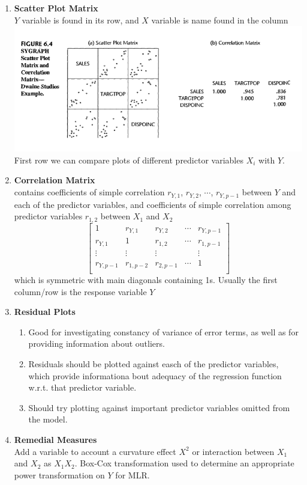 \documentclass[11pt]{article}
\begin{document}
\begin{enumerate}
    \item \textbf{Scatter Plot Matrix} \\
    $Y$ variable is found in its row, and $X$ variable is name found in the column \\ 
    \includegraphics[width=\textwidth]{scatter_plot_matrix.png} \\
    First row we can compare plots of different predictor variables $X_i$ with $Y$. 
    \item \textbf{Correlation Matrix} \\
    contains coefficients of simple correlation $r_{Y,1}$, $r_{Y,2}$, $\cdots$, $r_{Y,p-1}$ between $Y$ and each of the predictor variables, and coefficients of simple correlation among predictor variables $r_{1,2}$ between $X_1$ and $X_2$
    \[
        \begin{bmatrix}
            1 & r_{Y,1} & r_{Y,2} & \cdots & r_{Y,p-1} \\ 
            r_{Y,1} & 1 & r_{1,2} & \cdots & r_{1,p-1} \\ 
            \vdots & \vdots & \vdots & & \vdots \\
            r_{Y,p-1} & r_{1,p-2} & r_{2,p-1} & \cdots & 1 \\ 
        \end{bmatrix}    
    \]
    which is symmetric with main diagonals containing 1s. Usually the first column/row is the response variable $Y$
    \item \textbf{Residual Plots} \\
    \begin{enumerate}
        \item Good for investigating constancy of variance of error terms, as well as for providing information about outliers.
        \item Residuals should be plotted against easch of the predictor variables, which provide informationa bout adequacy of the regression function w.r.t. that predictor variable.
        \item Should try plotting against important predictor variables omitted from the model.
    \end{enumerate}
    \item \textbf{Remedial Measures} \\
    Add a variable to account a curvature effect $X^2$ or interaction between $X_1$ and $X_2$ as $X_1 X_2$. Box-Cox transformation used to determine an appropriate power transformation on $Y$ for MLR. 
     
\end{enumerate}
\end{document}

